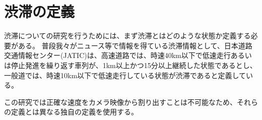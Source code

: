 \section{渋滞の定義}
渋滞についての研究を行うためには、まず渋滞とはどのような状態か定義する必要がある。
普段我々がニュース等で情報を得ている渋滞情報として、日本道路交通情報センター(JATIC)は、高速道路では、時速40km以下で低速走行あるいは停止発進を繰り返す車列が、1km以上かつ15分以上継続した状態であるとし、一般道では、時速10km以下で低速走行している状態が渋滞であると定義している。

この研究では正確な速度をカメラ映像から割り出すことは不可能なため、それらの定義とは異なる独自の定義を使用する。







